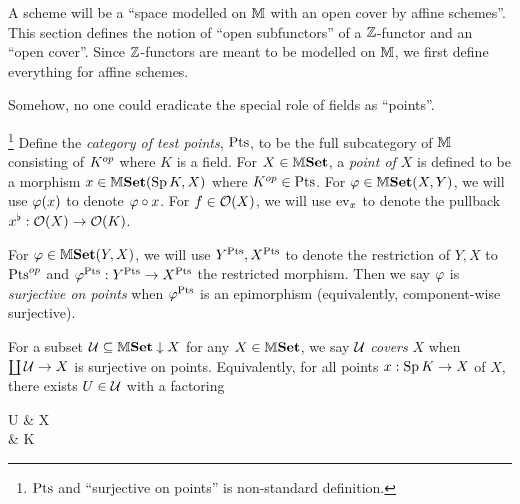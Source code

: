 \documentclass[../main.tex]{subfiles}
\begin{document}
\begin{rmk}
  A scheme will be a 
  ``space modelled on $\mathbb{M}$ with an open cover by affine schemes''.
  This section defines the notion of ``open subfunctors'' 
  of a $\mathbb{Z}$-functor and an ``open cover''.
  Since $\mathbb{Z}$-functors are meant to be 
  modelled on $\mathbb{M}$,
  we first define everything for affine schemes.

  Somehow, no one could eradicate the 
  special role of fields as ``points''. 
\end{rmk}

\begin{dfn}\footnote{
  $\mathrm{Pts}$ and ``surjective on points'' is non-standard definition.
  }
  Define the \emph{category of test points}, $\mathrm{Pts}$, 
  to be the full subcategory of $\mathbb{M}$ consisting of $K^{op}$ where $K$ is a field.
  For $X \in \mathbb{M}\mathbf{Set}$, 
  a \emph{point of $X$} is defined to be 
  a morphism $x \in \mathbb{M}\mathbf{Set}(\operatorname{Sp} K,X)$ where $K^{op} \in \mathrm{Pts}$.
  For $\varphi \in \mathbb{M}\mathbf{Set}(X,Y)$,
  we will use $\varphi(x)$ to denote $\varphi \circ x$.
  For $f \in \mathcal{O}(X)$, 
  we will use $\operatorname{ev}_x$ to denote the pullback $x^\flat : \mathcal{O}(X) \to \mathcal{O}(K)$.

  For $\varphi \in \mathbb{M}\mathbf{Set}(Y,X)$,
  we will use $Y^{\mathrm{Pts}},X^{\mathrm{Pts}}$ to denote the restriction of $Y,X$ to $\mathrm{Pts}^{op}$
  and $\varphi^{\mathrm{Pts}} : Y^{\mathrm{Pts}} \to X^{\mathrm{Pts}}$ the restricted morphism.
  Then we say $\varphi$ is \emph{surjective on points} when 
  $\varphi^{\mathrm{Pts}}$ is an epimorphism (equivalently, component-wise surjective).
  
  For a subset $\mathcal{U} \subseteq \mathbb{M}\mathbf{Set}\downarrow X$ for any $X \in \mathbb{M}\mathbf{Set}$,
  we say $\mathcal{U}$ \emph{covers} $X$ when 
  $\coprod \mathcal{U} \to X$ is surjective on points.
  Equivalently, for all points $x : \operatorname{Sp} K \to X$ of $X$, 
  there exists $U \in \mathcal{U}$ with a factoring 
  \begin{cd}
    U \ar[r] & X \\
    & \SP K \ar[u,"x"{swap}] \ar[ul]
  \end{cd}
\end{dfn}
\end{document}
